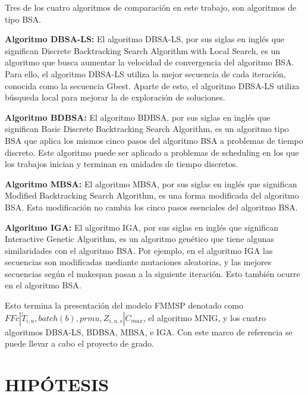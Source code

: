 \documentclass{article}
\def\notac_modelo{$FFc | \tilde{T}_{i, u}, batch(b), prmu, Z_{i, u, s} | C_{max}$}
\begin{document}
\vspace{\baselineskip}
Tres de los cuatro algoritmos de comparación en este trabajo, son algoritmos de tipo BSA.

\vspace{\baselineskip}
\textbf{Algoritmo DBSA-LS:} El algoritmo DBSA-LS, por sus siglas en inglés que significan Discrete Backtracking Search Algorithm with Local Search, es un algoritmo que busca aumentar la velocidad de convergencia del algoritmo BSA. Para ello, el algoritmo DBSA-LS utiliza la mejor secuencia de cada iteración, conocida como la secuencia Gbest. Aparte de esto, el algoritmo DBSA-LS utiliza búsqueda local para mejorar la de exploración de soluciones. \autocite{modFMMSP}

\vspace{\baselineskip}
\textbf{Algoritmo BDBSA:} El algoritmo BDBSA, por sus siglas en inglés que significan Basic Discrete Backtracking Search Algorithm, es un algoritmo tipo BSA que aplica los mismos cinco pasos del algoritmo BSA a problemas de tiempo discreto. Este algoritmo puede ser aplicado a problemas de scheduling en los que los trabajos inician y terminan en unidades de tiempo discretos. \autocite{modFMMSP}

\vspace{\baselineskip}
\textbf{Algoritmo MBSA:} El algoritmo MBSA, por sus siglas en inglés que significan Modified Backtracking Search Algorithm, es una forma modificada del algoritmo BSA. Esta modificación no cambia los cinco pasos esenciales del algoritmo BSA. \autocite{modFMMSP}

\vspace{\baselineskip}
\textbf{Algoritmo IGA:} El algoritmo IGA, por sus siglas en inglés que significan Interactive Genetic Algorithm, es un algoritmo genético que tiene algunas similaridades con el algoritmo BSA. Por ejemplo, en el algoritmo IGA las secuencias son modificadas mediante mutaciones aleatorias, y las mejores secuencias según el makespan pasan a la siguiente iteración. Esto también ocurre en el algoritmo BSA. \autocite{modFMMSP}

\vspace{\baselineskip}
Esto termina la presentación del modelo FMMSP denotado como \linebreak \notac_modelo, el algoritmo MNIG, y los cuatro algoritmos DBSA-LS, BDBSA, MBSA, e IGA. Con este marco de referencia se puede llevar a cabo el proyecto de grado.

\section{HIPÓTESIS}
\end{document}
